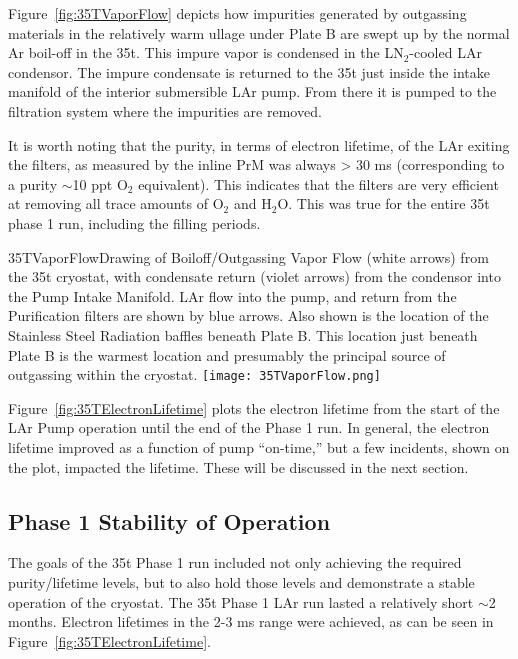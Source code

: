 Figure~\ref{fig:35TVaporFlow} depicts how impurities generated by outgassing materials in the 
relatively warm ullage under Plate B are swept up by the normal Ar boil-off in the 35t. This impure vapor 
is condensed in the LN$_2$-cooled LAr condensor. The impure condensate is returned to the 35t just inside 
the intake manifold of the interior submersible LAr pump. From there it is pumped to the filtration 
system where the impurities are removed.

It is worth noting that the purity, in terms of electron lifetime, of the LAr exiting the filters, as measured by the inline PrM was always  
> 30 ms (corresponding to a purity $\sim$10 ppt O$_2$ equivalent). This indicates that the filters are very efficient at removing all 
trace amounts of O$_2$ and H$_2$O. This was true for the entire 35t phase 1 run, including the filling periods.

\begin{cdrfigure}{35TVaporFlow}{Drawing of Boiloff/Outgassing Vapor Flow (white 
arrows) from the 35t cryostat, with condensate return (violet arrows) from the condensor into the Pump 
Intake Manifold. LAr flow into the pump, and return from the Purification filters are shown by blue 
arrows. Also shown is the location of the Stainless Steel Radiation baffles beneath Plate B. This location 
just beneath Plate B is the warmest location and presumably the principal source of outgassing within the 
cryostat.}
  \texttt{[image: 35TVaporFlow.png]}
\end{cdrfigure}

Figure~\ref{fig:35TElectronLifetime} plots the electron lifetime from the start of the LAr Pump operation until the end of the Phase 1 run. In general, the electron lifetime improved as a function of pump 
``on-time,'' but %
a few incidents, shown on the plot, %
impacted the lifetime. These will be discussed in the next section.

\subsection {Phase 1 Stability of Operation}

The goals of the 35t Phase 1 run included not only achieving the required purity/lifetime levels, but to 
also hold those levels and demonstrate a stable operation of the cryostat. The 35t Phase 1 LAr run lasted a relatively 
short $\sim$2 months.%
Electron lifetimes in the 2-3 ms range were achieved, as can be seen in 
Figure~\ref{fig:35TElectronLifetime}.


